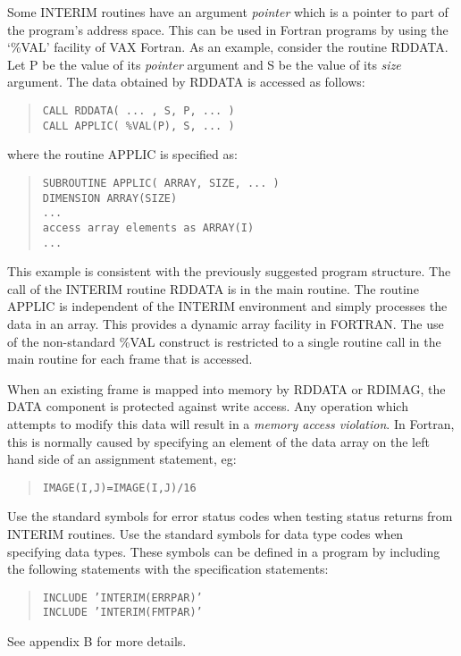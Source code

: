 \documentclass{article}
\begin{document}
Some INTERIM routines have an argument {\em pointer} which is a pointer to part of
the program's address space.
This can be used in Fortran programs by using the `\%VAL' facility of VAX
Fortran.
As an example, consider the routine RDDATA.
Let P be the value of its {\em pointer} argument and S be the value of its
{\em size} argument.
The data obtained by RDDATA is accessed as follows:
\begin{quote}
{\tt CALL RDDATA( ... , S, P, ... )\\
CALL APPLIC( \%VAL(P), S, ... )}
\end{quote}
where the routine APPLIC is specified as:
\begin{quote}
{\tt SUBROUTINE APPLIC( ARRAY, SIZE, ... )\\
DIMENSION ARRAY(SIZE)\\
\hspace{10mm}...\\
access array elements as ARRAY(I)\\
\hspace{10mm}...}
\end{quote}
This example is consistent with the previously suggested program structure.
The call of the INTERIM routine RDDATA is in the main routine.
The routine APPLIC is independent of the INTERIM environment and simply
processes the data in an array.
This provides a dynamic array facility in FORTRAN.
The use of the non-standard \%VAL construct is restricted to a single routine
call in the main routine for each frame that is accessed.

When an existing frame is mapped into memory by RDDATA or RDIMAG, the DATA
component is protected against write access.
Any operation which attempts to modify this data will result in a {\em memory
access violation}.
In Fortran, this is normally caused by specifying an element of the data array
on the left hand side of an assignment statement, eg:
\begin{quote}
{\tt IMAGE(I,J)=IMAGE(I,J)/16}
\end{quote}
Use the standard symbols for error status codes when testing status returns
from INTERIM routines.
Use the standard symbols for data type codes when specifying data types.
These symbols can be defined in a program by including the following statements
with the specification statements:
\begin{quote}
{\tt INCLUDE 'INTERIM(ERRPAR)'\\
INCLUDE 'INTERIM(FMTPAR)'}
\end{quote}
See appendix B for more details.
\end{document}
